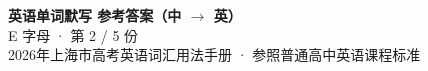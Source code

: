 \documentclass[10pt,a4paper]{article}
\begin{document}
\pagestyle{plain}

\begin{center}
{\LARGE\bfseries 英语单词默写 \quad 参考答案（中 $\to$ 英）}\\[0.22em]
{\large E 字母 · 第 2 / 5 份}\\[0.18em]
{\small 2026年上海市高考英语词汇用法手册 · 参照普通高中英语课程标准}
\end{center}

\vspace{0.2em}
\noindent{\color{rulegray}\rule{\textwidth}{0.8pt}}

\vspace{0.35em}

\vspace{0.25em}
\renewcommand{\arraystretch}{1.32}
\end{document}
